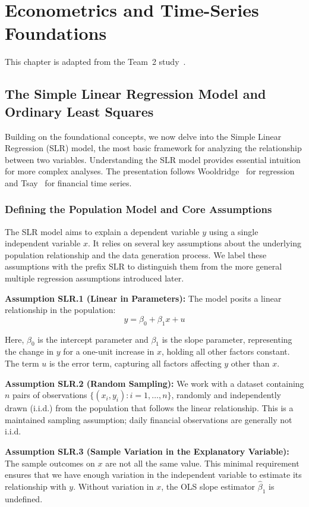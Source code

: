 \chapter{Econometrics and Time-Series Foundations}
\label{ch:econometrics}
This chapter is adapted from the Team~2 study~\cite{team2}.

\section{The Simple Linear Regression Model and Ordinary Least Squares}

Building on the foundational concepts, we now delve into the Simple Linear Regression (SLR) model, the most basic framework for analyzing the relationship between two variables. Understanding the SLR model provides essential intuition for more complex analyses. The presentation follows Wooldridge~\cite{Wooldridge2020} for regression and Tsay~\cite{Tsay2010} for financial time series.
\subsection{Defining the Population Model and Core Assumptions}

The SLR model aims to explain a dependent variable $y$ using a single independent variable $x$. It relies on several key assumptions about the underlying population relationship and the data generation process. We label these assumptions with the prefix SLR to distinguish them from the more general multiple regression assumptions introduced later.

\textbf{Assumption SLR.1 (Linear in Parameters):} The model posits a linear relationship in the population:
$$y = \beta_0 + \beta_1 x + u$$

Here, $\beta_0$ is the intercept parameter and $\beta_1$ is the slope parameter, representing the change in $y$ for a one-unit increase in $x$, holding all other factors constant. The term $u$ is the error term, capturing all factors affecting $y$ other than $x$.

\textbf{Assumption SLR.2 (Random Sampling):} We work with a dataset containing $n$ pairs of observations $\{(x_i, y_i): i = 1, \ldots, n\}$, randomly and independently drawn (i.i.d.) from the population that follows the linear relationship. This is a maintained sampling assumption; daily financial observations are generally not i.i.d.

\textbf{Assumption SLR.3 (Sample Variation in the Explanatory Variable):} The sample outcomes on $x$ are not all the same value. This minimal requirement ensures that we have enough variation in the independent variable to estimate its relationship with $y$. Without variation in $x$, the OLS slope estimator $\hat{\beta}_1$ is undefined.

